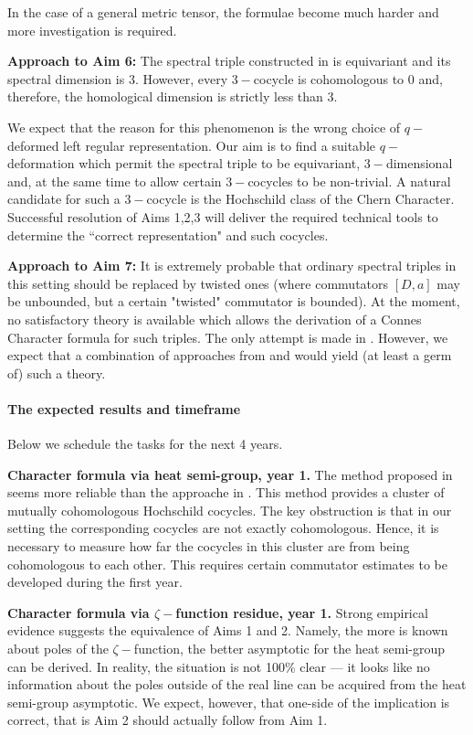 \documentclass[12pt]{article}
\begin{document}
In the case of a general metric tensor, the formulae become much harder and more investigation is required. 

{\bf Approach to Aim 6:} The spectral triple constructed in \cite{ChakrabortyPal} is equivariant and its spectral dimension is $3.$ However, every $3-$cocycle is cohomologous to $0$ and, therefore, the homological dimension is strictly less than $3.$ 

We expect that the reason for this phenomenon is the wrong choice of $q-$deformed left regular representation. Our aim is to find a suitable $q-$deformation which permit the spectral triple to be equivariant, $3-$dimensional and, at the same time to allow certain $3-$cocycles to be non-trivial. A natural candidate for such a $3-$cocycle is the Hochschild class of the Chern Character. Successful resolution of Aims 1,2,3 will deliver the required technical tools to determine the ``correct representation" and such cocycles.

{\bf Approach to Aim 7:} It is extremely probable that ordinary spectral triples in this setting should be replaced by twisted ones (where commutators $[D,a]$ may be unbounded, but a certain "twisted" commutator is bounded). At the moment, no satisfactory theory is available which allows the derivation of a Connes Character formula for such triples. The only attempt is made in \cite{MasF}. However, we expect that a combination of approaches from \cite{MasF} and \cite{CRSZ} would yield (at least a germ of) such a theory.

\paragraph*{The expected results and timeframe} Below we schedule the tasks for the next 4 years.

{\bf Character formula via heat semi-group, year 1.} The method proposed in \cite{CRSZ} seems more reliable than the approache in \cite{GVF}. This method provides a cluster of mutually cohomologous Hochschild cocycles. The key obstruction is that in our setting the corresponding cocycles are not exactly cohomologous. Hence, it is necessary to measure how far the cocycles in this cluster are from being cohomologous to each other. This requires certain commutator estimates to be developed during the first year.

{\bf Character formula via $\zeta-$function residue, year 1.} Strong empirical evidence suggests the equivalence of Aims 1 and 2. Namely, the more is known about poles of the $\zeta-$function, the better asymptotic for the heat semi-group can be derived. In reality, the situation is not 100\% clear --- it looks like no information about the poles outside of the real line can be acquired from the heat semi-group asymptotic. We expect, however, that one-side of the implication is correct, that is Aim 2 should actually follow from Aim 1.
\end{document}
